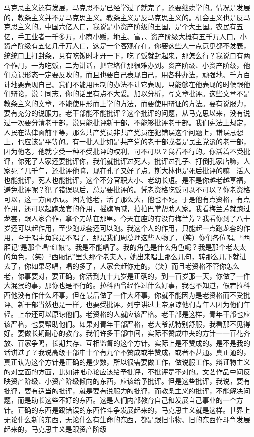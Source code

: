 马克思主义还有发展，马克思不是已经学过了就完了，还要继续学的。情况是发展的，教条主义并不是马克思主义。教条主义是反马克思主义的。机会主义也是反马克思主义的。中国六亿人口，我说是小资产阶级的王国，是个大王国。农民有五亿，手工业者一千多万，小商小贩，地主、富，、资产阶级大概有五千万人口，小资产阶级有五亿几千万人口，这是一个客观存在。你要这些人一点意见都不发表，统统口上打封条，只有吃饭时才开一下，吃了饭就封起来，那怎么行？我说口有两个作用，一为吃饭，二为讲话，把它堵住那很难办到。资产阶级、小资产阶级，他们意识形态一定要反映的，而且也要自己表现自己，用各种办法，顽强地、千方百计地要表现自己。我们不能用压制的办法不让它表现，只能够在他表现的时候跟他们辩论，说：同志，你的话里有点不大妥。加以分析，写文章批评。这些文章不是教条主义的文章，不能使用形而上学的方法，而要使用辩证的方法。要有说服力，要有充分的说服力。老干部能不能批评？这个批评的问题，从马克思以来，没有说过一次要分清老干部，说只能批评新干部，不能够批评老干部。我们宪法上规定，人民在法律面前平等，那么共产党员非共产党员在犯错误这个问题上，错误思想上，也应该是平等的。有一批人比如是共产党的老干部或者是民主党派的老干部，因为他老，他就享受一种不受批评的权利，可不可以？我看不行的。你活着不受批评，你死了人家还要批评你，我们就批评过死人，批评过孔子、打倒孔家店嘛，人家死了几千年，还批评他嘛，现在孔子又好了点。斯大林也是死后批评的嘛！活人也能批评，死人也能批评，这个不分官职大小、老幼长短。是不是你越老越享福，避免批评呢？犯了错误以后，总是要批评的。凭老资格吃饭可以不可以？你老资格可以，这一方面承认。因为他老，活了那么大，他也不死。于是他有点资格，有点作用，还可以起跑龙套的作用，摇旗吶喊，拍拍巴掌帮助人家。我看梅兰芳就跑过龙套，跟人家合作，拿个刀站在那里。今天在座的有没有梅兰芳？我看你到了八十岁还可以起作用，至少跑龙套还可以跑。我这个人的作用，只能起一点跑龙套的作用，至于唱主角我是不唱了，那是我们周总理这些人物了，（笑）你们各位唱。“西厢记”是那个唱“红娘”。我是不能唱了。我的角色是什么角色呢？我是那个老太太的角色，（笑）“西厢记”里头那个老夫人，她出来唱上那么几句，转那么几下就进去了，你如果尽唱，唱的多了，人家会赶你走的，（笑）而且老资格不管你怎么老，你事要对，要正确，你活到九十九岁是正确的，到一百岁那一天，你做了一件大混蛋的事，那你也是不行的。拉科西曾经作过什么好事，我也不知道，假若拉科西他没有作什么坏事，但在最后做了一件大坏事，你就不能因为是老资格而不受批评。新干部当然也是一样，也要受批评。列宁讲过上帝原谅他们青年人因为他们年轻。上帝还可以原谅他们。老资格的人就应该严格。老干部是这样，青年干部也应该严格，也要帮助他们。如果对青年干部严格，老大爷就特别舒服，我看那不见得好。要做长期耐心的教育。我们许多干部中间，实际不赞成中央的方针一一百花齐放、百家争鸣，长期共存、互相监督的这个方针。实际上是不赞成的。是不是我的话讲过了？我说高级干部中十个有九个不赞成或半赞成，或者不甚通。真正通的，真正认为这个方针是正确的是少数，所以很需要做工作，做说服工作。辩证物主义的对立面的方面，比如讲唯心论应该给予批评，不批评是不对的。文艺作品中间反映资产阶级、小资产阶级倾向的东西，应该给予批评。但是这些批评，我说，要有批评，要有适当的批评，就是要有说服力的批评，而教条主义的批评，不能解决问题，而是助长这些不好的东西。这是人们内部教育自己和发展自己事业的一个方针。正确的东西是跟错误的东西作斗争发展起来的，马克思主义就是这样。世界上无论什么新的东西，无论什么有生命的东西，都是跟旧事物、旧的东西作斗争发展起来的，马克思主义是跟资产阶级